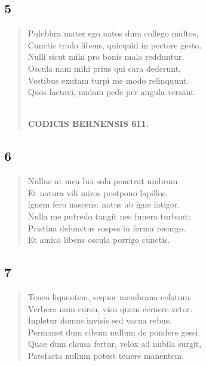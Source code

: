 \documentclass[11pt, a4paper]{report}
\begin{document}
            \subsection*{5}
      \begin{verse}
      Pulcbhra mater ego natos dum collego multos, \\ Cunctis trado libens, quicquid in pectore gesto. \\ Nulli sicut mihi pro bonis mala redduntur. \\ Oscula nam mihi prius qui cara dederunt, \\ Vestibus exutam turpi me modo relinquunt. \\ Quos lactavi, nudam pede per angula versant. \\ 
        ﻿\pagebreak 
    \begin{center} \textbf{CODICIS BERNENSIS 611.} \end{center} \marginpar{[353]} 
      \end{verse}
  
            \subsection*{6}
      \begin{verse}
      Nullus ut mea lux sola penetrat umbram \\ Et natura vili miros postpono lapillos. \\ lgnem fero nascens: natus ab igne fatigor. \\ Nulla me putredo tangit nec funera turbant: \\ Pristina defunctus sospes in forma resurgo. \\ Et amica libens oscula porrigo cunctis. \\ 
      \end{verse}
  
            \subsection*{7}
      \begin{verse}
      Teneo liquentem, sequor membrana celatum. \\ Verbero nam cursu, visu quem cernere vetor. \\ Inpletur domus invisis sed vacua rebus. \\ Permanet dum cibum nullum de pondere gessi. \\ Quae dum clausa fertur, velox ad nubila surgit, \\ Patefacta nullum potest tenere manentem. \\ 
      \end{verse}
  
\end{document}
